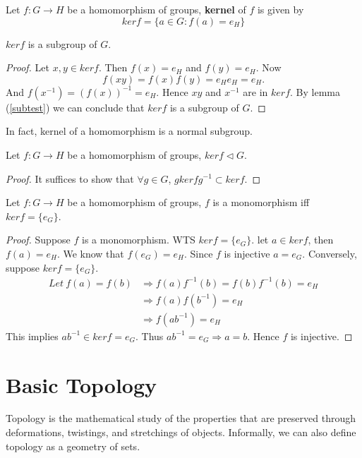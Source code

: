 \begin{definition}
Let $f : G \rightarrow H$ be a homomorphism of groups, \textbf{kernel} of $f$ is given by
$$ kerf=\{a\in G:f(a)=e_H\}$$
\end{definition}

\begin{lemma}
$kerf$ is a subgroup of $G$.
\end{lemma}

\begin{proof}
Let $x,y\in kerf$. Then $f(x)=e_H$ and $f(y)=e_H$. Now $$f(xy)=f(x)f(y)=e_He_H=e_H.$$ And $f(x^{-1})=(f(x))^{-1}=e_H.$ Hence $xy$ and $x^{-1}$ are in $kerf$. By lemma (\ref{subtest}) we can conclude that $kerf$ is a subgroup of $G$.
\end{proof}

In fact, kernel of a homomorphism is a normal subgroup.
\begin{proposition}
Let $f : G \rightarrow H$ be a homomorphism of groups, $kerf\lhd G$.
\end{proposition}

\begin{proof}
It suffices to show that $\forall g\in G$, $gkerf g^{-1}\subset kerf.$
\end{proof}

\begin{theorem}
Let $f : G \rightarrow H$ be a homomorphism of groups, $f$ is a monomorphism iff $kerf=\{e_G\}$.
\end{theorem}
\begin{proof}
Suppose $f$ is a monomorphism. WTS $kerf=\{e_G\}$. let $a\in kerf$, then $f(a)=e_H$. We know that $f(e_G)=e_H$. Since $f$ is injective $a=e_G$. Conversely, suppose $kerf=\{e_G\}$.
\begin{align*}
 Let~f(a)=f(b) &\Rightarrow f(a)f^{-1}(b)=f(b)f^{-1}(b)=e_H\\
               &\Rightarrow f(a)f(b^{-1})=e_H\\
               &\Rightarrow f(ab^{-1})=e_H
\end{align*}
This implies $ab^{-1}\in kerf={e_G}$. Thus $ab^{-1}=e_G\Rightarrow a=b.$ Hence $f$ is injective.
\end{proof}
\newpage
\section{Basic Topology}
Topology is the mathematical study of the properties that are preserved through deformations, twistings, and stretchings of objects. Informally, we can also define topology as a geometry of sets.


